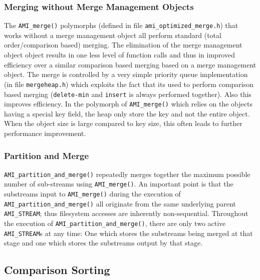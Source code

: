 \subsubsection{Merging without Merge Management Objects}

\tobeextended

The \verb|AMI_merge()| polymorphs (defined in file
\verb|ami_optimized_merge.h|) that works without a merge management object
all perform standard (total order/comparison based) merging. The
elimination of the merge management object object results in one less level
of function calls and thus in improved efficiency over a similar comparison
based merging based on a merge management object. The merge is controlled
by a very simple priority queue implementation (in file \verb|mergeheap.h|)
which exploits the fact that its used to perform comparison based merging
(\verb|delete-min| and \verb|insert| is always performed together). Also
this improves efficiency. In the polymorph of \verb|AMI_merge()| which
relies on the objects having a special key field, the heap only store the
key and not the entire object. When the object size is large compared to
key size, this often leads to further performance improvement.

\subsubsection{Partition and Merge}

\tobeextended

\verb|AMI_partition_and_merge()| repeatedly merges together the maximum
possible number of sub-streams using \verb|AMI_merge()|. An important point
is that the substreams input to \verb|AMI_merge()| during the execution of
\verb|AMI_partition_and_merge()| all originate from the same underlying
parent \verb|AMI_STREAM|; thus filesystem accesses are inherently
non-sequential. Throughout the execution of
\verb|AMI_partition_and_merge()|, there are only two active
\verb|AMI_STREAM|s at any time: One which stores the substreams being
merged at that stage and one which stores the substreams output by that
stage.


\subsection{Comparison Sorting}
\label{sec:ref-imp-ami-sort}

